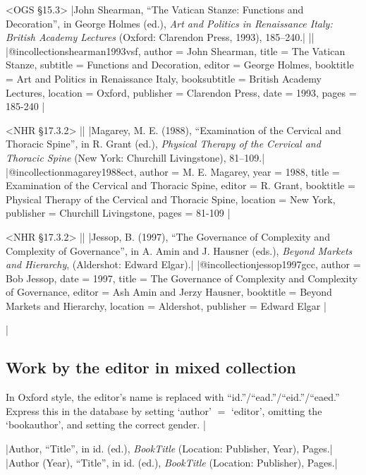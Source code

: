 \documentclass[extrafontsizes,11pt,a4paper,oneside]{memoir}
\newcommand*{\lit}[1]{\textsf{#1}}
\newcommand*{\code}[1]{`\textsf{#1}'}
\begin{document}
\bibexample<OGS \S15.3>
|John Shearman, \enquote{The Vatican Stanze: Functions and Decoration}, in George Holmes (ed.), \emph{Art and Politics in Renaissance Italy: British Academy Lectures} (Oxford: Clarendon Press, 1993), 185--240.|%
||%
|@incollection{shearman1993vsf,
  author = {John Shearman},
  title = {The Vatican Stanze},
  subtitle = {Functions and Decoration},
  editor = {George Holmes},
  booktitle = {Art and Politics in Renaissance Italy},
  booksubtitle = {British Academy Lectures},
  location = {Oxford},
  publisher = {Clarendon Press},
  date = {1993},
  pages = {185-240}
}|

\bibexample<NHR \S17.3.2>
||%
|Magarey, M. E. (1988), \enquote{Examination of the Cervical and Thoracic Spine}, in R. Grant (ed.), \emph{Physical Therapy of the Cervical and Thoracic Spine} (New York: Churchill Livingstone), 81–109.|%
|@incollection{magarey1988ect,
  author = {M. E. Magarey},
  year = {1988},
  title = {Examination of the Cervical and Thoracic Spine},
  editor = {R. Grant},
  booktitle = {Physical Therapy of the Cervical and Thoracic Spine},
  location = {New York},
  publisher = {Churchill Livingstone},
  pages = {81-109}
}|

\bibexample<NHR \S17.3.2>
||%
|Jessop, B. (1997), \enquote{The Governance of Complexity and Complexity of Governance}, in A. Amin and J. Hausner (eds.), \emph{Beyond Markets and Hierarchy}, (Aldershot: Edward Elgar).|%
|@incollection{jessop1997gcc,
  author = {Bob Jessop},
  date = {1997},
  title = {The Governance of Complexity and Complexity of Governance},
  editor = {Ash Amin and Jerzy Hausner},
  booktitle = {Beyond Markets and Hierarchy},
  location = {Aldershot},
  publisher = {Edward Elgar}
}|

\todoc|
\subsection{Work by the editor in mixed collection}

In Oxford style, the editor's name is replaced with \enquote{id.}\slash \enquote{ead.}\slash \enquote{eid.}\slash \enquote{eaed.} Express this in the database by setting \code{author} $=$ \code{editor}, omitting the \code{bookauthor}, and setting the correct gender.
|

\specs
|Author, \enquote{Title}, \lit{in id.} (\lit{ed.}), \emph{BookTitle} (Location: Publisher, Year), Pages.|%
|Author (Year), \enquote{Title}, \lit{in id.} (\lit{ed.}), \emph{BookTitle} (Location: Publisher), Pages.|
\end{document}
